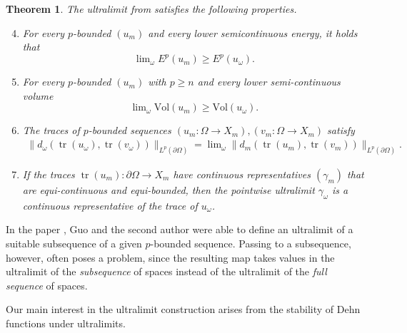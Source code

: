 \documentclass[a4paper,leqno]{amsart}
\numberwithin{equation}{section}
\newtheorem{theorem}{Theorem}[section]
\theoremstyle{remark}
\theoremstyle{remark}
\DeclareMathOperator{\trace}{tr}
\begin{document}
\begin{theorem}\label{theorem-ultralimit-trace-properties}
The ultralimit from  satisfies the following properties.
\begin{enumerate}\setcounter{enumi}{3}
    \item\label{ultralimit:lower-semicontinuity-energy} For every $p$-bounded $(u_m)$ and every lower semicontinuous energy, it holds that $$\lim\nolimits_{\omega} E^{p}( u_m ) \geq E^p( u_\omega ).$$
    \item\label{ultralimit:lower-semicontinuity-volume} For every $p$-bounded $(u_m)$ with $p\geq n$ and every lower semi-continuous volume $$\lim\nolimits_{\omega} \mathrm{Vol}(u_m) \geq \mathrm{Vol}(u_\omega).$$
    \item\label{ultralimit:comparing-traces} The traces of $p$-bounded sequences $( u_m \colon \Omega \to X_m ), ( v_m \colon \Omega \to X_m )$ satisfy 
        \begin{align*}
            \|  d_\omega( \trace( u_\omega ), \trace( v_\omega ) ) \|_{ L^{p}( \partial \Omega ) }
            =
            \lim\nolimits_{\omega} \| d_m( \trace( u_{m} ), \trace( v_{m} ) ) \|_{ L^{p}( \partial \Omega ) }.
        \end{align*}
    \item\label{ultralimit:compatibility-of-traces} If the traces $\trace(u_m) \colon \partial \Omega \to X_m$ have continuous representatives $( \gamma_m )$ that are equi-continuous and equi-bounded, then the pointwise ultralimit $\gamma_\omega$ is a continuous representative of the trace of $u_\omega$.
\end{enumerate}
\end{theorem}
In the paper \cite{guo-wenger-2020-area-minimizing-discs-in-locally-non-compact-metric-spaces}, Guo and the second author were able to define an ultralimit of a suitable subsequence of a given $p$-bounded sequence. Passing to a subsequence, however, often poses a problem, since the resulting map takes values in the ultralimit of the \emph{subsequence} of spaces instead of the ultralimit of the \emph{full sequence} of spaces. 

Our main interest in the ultralimit construction arises from the stability of Dehn functions under ultralimits.
\end{document}
